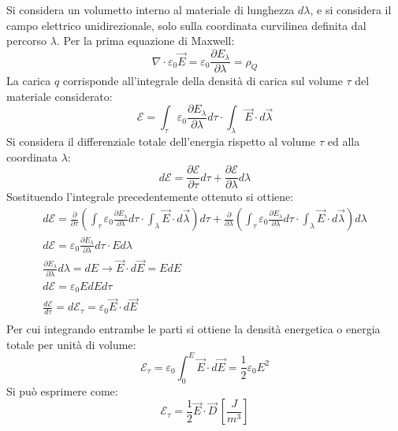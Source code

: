 \documentclass{article}
\numberwithin{equation}{subsection}
\begin{document}
Si considera un volumetto interno al materiale di lunghezza $d\lambda$, e si considera il campo elettrico unidirezionale, solo sulla coordinata curvilinea definita dal 
percorso $\lambda$. Per la prima equazione di Maxwell:
\begin{equation*}
    \nabla\cdot\varepsilon_0\vec{E}=\varepsilon_0\displaystyle\frac{\partial E_{\lambda}}{\partial\lambda}=\rho_Q
\end{equation*}
La carica $q$ corrisponde all'integrale della densità di carica sul volume $\tau$ del materiale considerato:
\begin{equation*}
    \mathscr{E}=\displaystyle\int_{\tau}\varepsilon_0\frac{\partial E_{\lambda}}{\partial\lambda}d\tau\cdot\int_{\lambda}\vec{E}\cdot d\vec{\lambda}
\end{equation*}
Si considera il differenziale totale dell'energia rispetto al volume $\tau$ ed alla coordinata $\lambda$:
\begin{equation*}
    d\mathscr{E}=\displaystyle\frac{\partial \mathscr{E}}{\partial \tau}d\tau+\frac{\partial\mathscr{E}}{\partial \lambda}d\lambda
\end{equation*}
Sostituendo l'integrale precedentemente ottenuto si ottiene:
\begin{gather*}
    d\mathscr{E}=\frac{\partial}{\partial \tau}\left(\displaystyle\int_{\tau}\varepsilon_0\frac{\partial E_{\lambda}}{\partial\lambda}d\tau\cdot\int_{\lambda}\vec{E}\cdot d\vec{\lambda}\right)d\tau+\frac{\partial}{\partial \lambda}\left(\displaystyle\int_{\tau}\varepsilon_0\frac{\partial E_{\lambda}}{\partial\lambda}d\tau\cdot\int_{\lambda}\vec{E}\cdot d\vec{\lambda}\right)d\lambda\\
    d\mathscr{E}=\displaystyle\varepsilon_0\frac{\partial E_{\lambda}}{\partial\lambda}d\tau\cdot Ed\lambda\\
    \displaystyle\frac{\partial E_{\lambda}}{\partial \lambda}d\lambda=dE\to\vec{E}\cdot d\vec{E}=EdE\\
    d\mathscr{E}=\varepsilon_0EdEd\tau\\
    \frac{d\mathscr{E}}{d\tau}=d\mathscr{E}_{\tau}=\varepsilon_0\vec{E}\cdot d\vec{E}\\
\end{gather*}
Per cui integrando entrambe le parti si ottiene la densità energetica o energia totale per unità di volume:
\begin{equation*}
    \mathscr{E}_\tau=\varepsilon_0\displaystyle\int_{0}^E\vec{E}\cdot d\vec{E}=\frac{1}{2}\varepsilon_0E^2
\end{equation*}
Si può esprimere come:
\begin{equation}
    \mathscr{E}_{\tau}=\displaystyle\frac{1}{2}\vec{E}\cdot\vec{D}\,\left[\frac{J}{m^3}\right]
\end{equation}
\end{document}
